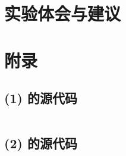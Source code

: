 \documentclass{dspreport}
\begin{document}
\begin{figure}[H]
    \centering
\end{figure}

\begin{block}

\end{block}

\section{实验体会与建议}
\begin{block}

\end{block}

\section{附录}
\subsection{(1) 的源代码}
\inputminted{matlab}{scripts/report-3/exp3_5_4_1.m}

\subsection{(2) 的源代码}
\inputminted{matlab}{scripts/report-3/exp3_5_4_2.m}
\end{document}

